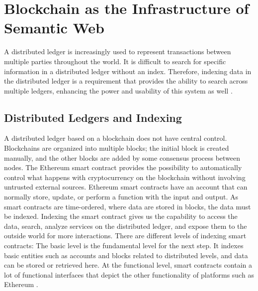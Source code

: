 \chapter{Blockchain as the Infrastructure of Semantic Web}
A distributed ledger is increasingly used to represent transactions between multiple parties throughout the world. It is difficult to search for specific information in a distributed ledger without an index. Therefore, indexing data in the distributed ledger is a requirement that provides the ability to search across multiple ledgers, enhancing the power and usability of this system as well \cite{Third}.
\section{Distributed Ledgers and Indexing}
A distributed ledger based on a blockchain does not have central control. Blockchains are organized into multiple blocks; the initial block is created manually, and the other blocks are added by some consensus process between nodes.
The Ethereum smart contract provides the possibility to automatically control what happens with cryptocurrency on the blockchain without involving untrusted external sources. Ethereum smart contracts have an account that can normally store, update, or perform a function with the input and output.
As smart contracts are time-ordered, where data are stored in blocks, the data must be indexed. Indexing the smart contract gives us the capability to access the data, search, analyze services on the distributed ledger, and expose them to the outside world for more interactions.
There are different levels of indexing smart contracts: The basic level is the fundamental level for the next step. It indexes basic entities such as accounts and blocks related to distributed levels, and data can be stored or retrieved here. At the functional level, smart contracts contain a lot of functional interfaces that depict the other functionality of platforms such as Ethereum \cite{Third}.

